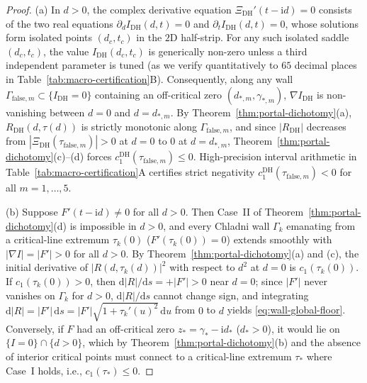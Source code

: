 \documentclass[11pt,reqno]{amsart}
\theoremstyle{definition}
\theoremstyle{remark}
\numberwithin{equation}{section}
\newcommand{\dd}{\mathrm{d}}
\newcommand{\ii}{\mathrm{i}}
\newcommand{\DHf}{\mathrm{DH}}
\begin{document}
\begin{proof}
(a) In $d>0$, the complex derivative equation $\Xi_{\DHf}'(t-\ii d)=0$ consists of the two real equations $\partial_d I_{\DHf}(d,t)=0$ and $\partial_t I_{\DHf}(d,t)=0$, whose solutions form isolated points $(d_c,t_c)$ in the $2$D half-strip. For any such isolated saddle $(d_c,t_c)$, the value $I_{\DHf}(d_c,t_c)$ is generically non-zero unless a third independent parameter is tuned (as we verify quantitatively to $65$ decimal places in Table~\ref{tab:macro-certification}B). Consequently, along any wall $\Gamma_{\mathrm{false},m} \subset \{I_{\DHf}=0\}$ containing an off-critical zero $(d_{*,m},\gamma_{*,m})$, $\nabla I_{\DHf}$ is non-vanishing between $d=0$ and $d=d_{*,m}$. By Theorem~\ref{thm:portal-dichotomy}(a), $R_{\DHf}(d,\tau(d))$ is strictly monotonic along $\Gamma_{\mathrm{false},m}$, and since $|R_{\DHf}|$ decreases from $|\Xi_{\DHf}(\tau_{\mathrm{false},m})|>0$ at $d=0$ to $0$ at $d=d_{*,m}$, Theorem~\ref{thm:portal-dichotomy}(c)--(d) forces $c_1^{\DHf}(\tau_{\mathrm{false},m}) \le 0$. High-precision interval arithmetic in Table~\ref{tab:macro-certification}A certifies strict negativity $c_1^{\DHf}(\tau_{\mathrm{false},m}) < 0$ for all $m=1,\dots,5$.

(b) Suppose $F'(t-\ii d) \ne 0$ for all $d > 0$. Then Case~II of Theorem~\ref{thm:portal-dichotomy}(d) is impossible in $d>0$, and every Chladni wall $\Gamma_k$ emanating from a critical-line extremum $\tau_k(0)$ ($F'(\tau_k(0))=0$) extends smoothly with $|\nabla I| = |F'| > 0$ for all $d > 0$. By Theorem~\ref{thm:portal-dichotomy}(a) and (c), the initial derivative of $|R(d,\tau_k(d))|^2$ with respect to $d^2$ at $d=0$ is $c_1(\tau_k(0))$. If $c_1(\tau_k(0)) > 0$, then $\dd|R|/\dd s = +|F'| > 0$ near $d=0$; since $|F'|$ never vanishes on $\Gamma_k$ for $d>0$, $\dd|R|/\dd s$ cannot change sign, and integrating $\dd|R| = |F'|\,\dd s = |F'|\sqrt{1+\tau_k'(u)^2}\,\dd u$ from $0$ to $d$ yields \eqref{eq:wall-global-floor}. Conversely, if $F$ had an off-critical zero $z_* = \gamma_* - \ii d_*$ ($d_* > 0$), it would lie on $\{I=0\}\cap\{d>0\}$, which by Theorem~\ref{thm:portal-dichotomy}(b) and the absence of interior critical points must connect to a critical-line extremum $\tau_*$ where Case~I holds, i.e., $c_1(\tau_*) \le 0$.
\end{proof}
\end{document}
